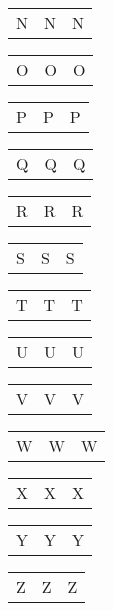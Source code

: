 \documentclass{minimal}
\begin{document}
\begin{longtable}{p{2.8cm}p{2.8cm}p{2.8cm}}
N & N & N
\end{longtable}

\begin{longtable}{p{2.8cm}p{2.8cm}p{2.8cm}}
O & O & O
\end{longtable}

\begin{longtable}{p{2.8cm}p{2.8cm}p{2.8cm}}
P & P & P
\end{longtable}

\begin{longtable}{p{2.8cm}p{2.8cm}p{2.8cm}}
Q & Q & Q
\end{longtable}

\begin{longtable}{p{2.8cm}p{2.8cm}p{2.8cm}}
R & R & R
\end{longtable}

\begin{longtable}{p{2.8cm}p{2.8cm}p{2.8cm}}
S & S & S
\end{longtable}

\begin{longtable}{p{2.8cm}p{2.8cm}p{2.8cm}}
T & T & T
\end{longtable}

\begin{longtable}{p{2.8cm}p{2.8cm}p{2.8cm}}
U & U & U
\end{longtable}

\begin{longtable}{p{2.8cm}p{2.8cm}p{2.8cm}}
V & V & V
\end{longtable}

\begin{longtable}{p{2.8cm}p{2.8cm}p{2.8cm}}
W & W & W
\end{longtable}

\begin{longtable}{p{2.8cm}p{2.8cm}p{2.8cm}}
X & X & X
\end{longtable}

\begin{longtable}{p{2.8cm}p{2.8cm}p{2.8cm}}
Y & Y & Y
\end{longtable}

\begin{longtable}{p{2.8cm}p{2.8cm}p{2.8cm}}
Z & Z & Z
\end{longtable}
\end{document}
